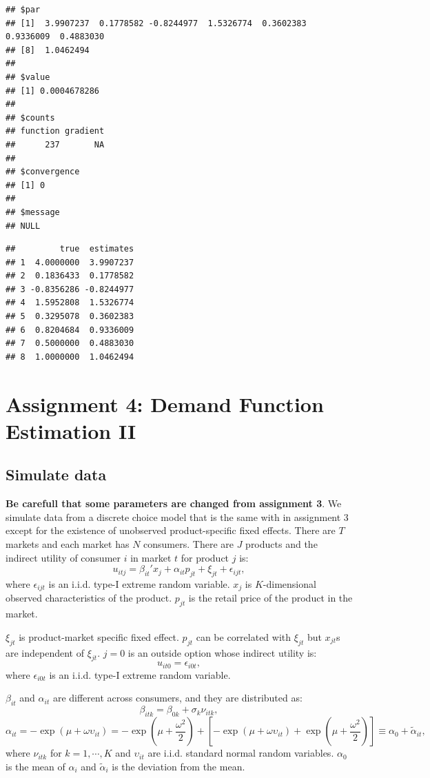 \documentclass[
]{book}
\begin{document}
\begin{verbatim}
## $par
## [1]  3.9907237  0.1778582 -0.8244977  1.5326774  0.3602383  0.9336009  0.4883030
## [8]  1.0462494
## 
## $value
## [1] 0.0004678286
## 
## $counts
## function gradient 
##      237       NA 
## 
## $convergence
## [1] 0
## 
## $message
## NULL
\end{verbatim}

\begin{verbatim}
##         true  estimates
## 1  4.0000000  3.9907237
## 2  0.1836433  0.1778582
## 3 -0.8356286 -0.8244977
## 4  1.5952808  1.5326774
## 5  0.3295078  0.3602383
## 6  0.8204684  0.9336009
## 7  0.5000000  0.4883030
## 8  1.0000000  1.0462494
\end{verbatim}

\hypertarget{assignment4}{%
\chapter{Assignment 4: Demand Function Estimation II}\label{assignment4}}

\hypertarget{simulate-data-3}{%
\section{Simulate data}\label{simulate-data-3}}

\textbf{Be carefull that some parameters are changed from assignment 3}. We simulate data from a discrete choice model that is the same with in assignment 3 except for the existence of unobserved product-specific fixed effects. There are \(T\) markets and each market has \(N\) consumers. There are \(J\) products and the indirect utility of consumer \(i\) in market \(t\) for product \(j\) is:
\[
u_{itj} = \beta_{it}' x_j + \alpha_{it} p_{jt} + \xi_{jt} + \epsilon_{ijt},
\]
where \(\epsilon_{ijt}\) is an i.i.d. type-I extreme random variable. \(x_j\) is \(K\)-dimensional observed characteristics of the product. \(p_{jt}\) is the retail price of the product in the market.

\(\xi_{jt}\) is product-market specific fixed effect. \(p_{jt}\) can be correlated with \(\xi_{jt}\) but \(x_{jt}\)s are independent of \(\xi_{jt}\). \(j = 0\) is an outside option whose indirect utility is:
\[
u_{it0} = \epsilon_{i0t},
\]
where \(\epsilon_{i0t}\) is an i.i.d. type-I extreme random variable.

\(\beta_{it}\) and \(\alpha_{it}\) are different across consumers, and they are distributed as:
\[
\beta_{itk} = \beta_{0k} + \sigma_k \nu_{itk},
\]
\[
\alpha_{it} = - \exp(\mu + \omega \upsilon_{it}) = - \exp(\mu + \frac{\omega^2}{2}) + [- \exp(\mu + \omega \upsilon_{it}) + \exp(\mu + \frac{\omega^2}{2})] \equiv \alpha_0 + \tilde{\alpha}_{it},
\]
where \(\nu_{itk}\) for \(k = 1, \cdots, K\) and \(\upsilon_{it}\) are i.i.d. standard normal random variables. \(\alpha_0\) is the mean of \(\alpha_i\) and \(\tilde{\alpha}_i\) is the deviation from the mean.
\end{document}
